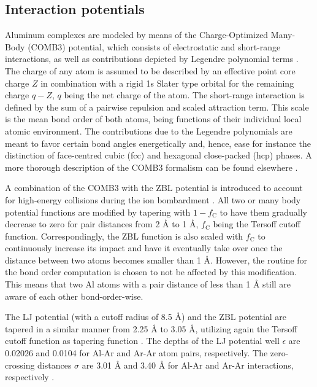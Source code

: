 \documentclass[12pt,a4paper,preprint,superscriptaddress]{revtex4-1}
\begin{document}
\subsection{Interaction potentials}
\label{ssec:interaction_potentials}

Aluminum complexes are modeled by means of the Charge-Optimized Many-Body (COMB3) potential, which consists of electrostatic and short-range interactions, as well as contributions depicted by Legendre polynomial terms \citep{choudhary2014charge,liang2013classical}. The charge of any atom is assumed to be described by an effective point core charge $Z$ in combination with a rigid 1s Slater type orbital for the remaining charge $q-Z$, $q$ being the net charge of the atom. The short-range interaction is defined by the sum of a pairwise repulsion and scaled attraction term. This scale is the mean bond order of both atoms, being functions of their individual local atomic environment. The contributions due to the Legendre polynomials are meant to favor certain bond angles energetically and, hence, ease for instance the distinction of face-centred cubic (fcc) and hexagonal close-packed (hcp) phases. A more thorough description of the COMB3 formalism can be found elsewhere \citep{liang2013classical}. 

A combination of the COMB3 with the ZBL potential is introduced to account for high-energy collisions during the ion bombardment \citep{ziegler1985stopping}. All two or many body potential functions are modified by tapering with $1-f_\mathrm{C}$ to have them gradually decrease to zero for pair distances from 2 \r A to 1 \r A, $f_\mathrm{C}$ being the Tersoff cutoff function. Correspondingly, the ZBL function is also scaled with $f_\mathrm{C}$ to continuously increase its impact and have it eventually take over once the distance between two atoms becomes smaller than 1 \r A. However, the routine for the bond order computation is chosen to not be affected by this modification. This means that two Al atoms with a pair distance of less than 1 \r A still are aware of each other bond-order-wise. 

The LJ potential (with a cutoff radius of 8.5 \r A) and the ZBL potential are tapered in a similar manner from 2.25 \r A to 3.05 \r A, utilizing again the Tersoff cutoff function as tapering function \citep{ziegler1985stopping}. The depths of the LJ potential well $\epsilon$ are 0.02026 and 0.0104 for Al-Ar and Ar-Ar atom pairs, respectively. The zero-crossing distances $\sigma$ are 3.01 \r A and 3.40 \r A for Al-Ar and Ar-Ar interactions, respectively \citep{sha2018molecular,valkealahti1986molecular}.
\end{document}

